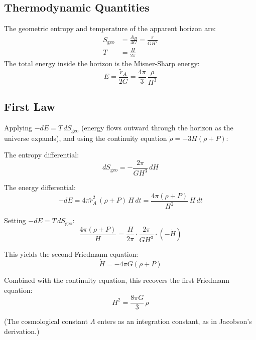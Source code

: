 \documentclass[aps,prd,twocolumn,superscriptaddress,nofootinbib]{revtex4-2}
\begin{document}
\subsection{Thermodynamic Quantities}

The geometric entropy and temperature of the apparent horizon are:
\begin{align}
S_\text{geo} &= \frac{A_H}{4G} = \frac{\pi}{GH^2} \label{eq:Sgeo} \\
T &= \frac{H}{2\pi} \label{eq:Tcaikim}
\end{align}
The total energy inside the horizon is the Misner-Sharp energy:
\begin{equation}
E = \frac{\tilde{r}_A}{2G} = \frac{4\pi}{3}\,\frac{\rho}{H^3}
\label{eq:energy}
\end{equation}

\subsection{First Law}

Applying $-dE = T\,dS_\text{geo}$ (energy flows outward through the horizon as the universe expands), and using the continuity equation $\dot{\rho} = -3H(\rho + P)$:

The entropy differential:
\begin{equation}
dS_\text{geo} = -\frac{2\pi}{GH^3}\,dH
\end{equation}

The energy differential:
\begin{equation}
-dE = 4\pi\tilde{r}_A^2\,(\rho + P)\,H\,dt = \frac{4\pi(\rho + P)}{H^2}\,H\,dt
\end{equation}

Setting $-dE = T\,dS_\text{geo}$:
\begin{equation}
\frac{4\pi(\rho + P)}{H} = \frac{H}{2\pi}\cdot\frac{2\pi}{GH^3}\cdot(-\dot{H})
\end{equation}

This yields the second Friedmann equation:
\begin{equation}
\dot{H} = -4\pi G(\rho + P)
\label{eq:friedmann2}
\end{equation}

Combined with the continuity equation, this recovers the first Friedmann equation:
\begin{equation}
H^2 = \frac{8\pi G}{3}\,\rho
\label{eq:friedmann1}
\end{equation}

(The cosmological constant $\Lambda$ enters as an integration constant, as in Jacobson's derivation.)
\end{document}

